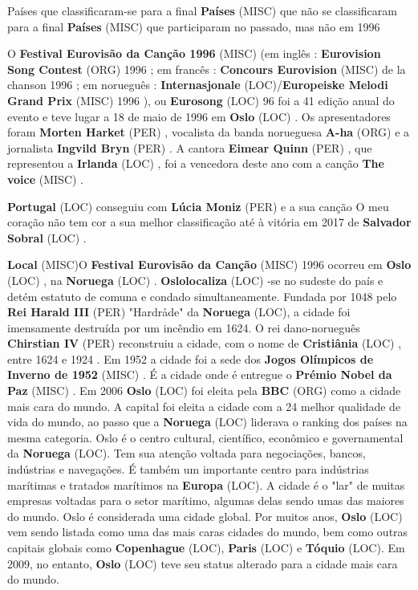 \documentclass[12pt,a4paper]{article}
\begin{document}
Países que classificaram-se para a final \textbf{Países} (MISC) que não se classificaram para a final \textbf{Países} (MISC) que participaram no passado, mas não em 1996

O \textbf{Festival Eurovisão da Canção 1996} (MISC) (em inglês : \textbf{Eurovision Song Contest} (ORG) 1996 ; em francês : \textbf{Concours Eurovision} (MISC) de la chanson 1996 ; em norueguês : \textbf{Internasjonale} (LOC)/\textbf{Europeiske Melodi Grand Prix} (MISC) 1996 ), ou \textbf{Eurosong} (LOC) 96 foi a 41 edição anual do evento e teve lugar a 18 de maio de 1996 em \textbf{Oslo} (LOC) . Os apresentadores foram \textbf{Morten Harket} (PER) , vocalista da banda norueguesa \textbf{A-ha} (ORG) e a jornalista \textbf{Ingvild Bryn} (PER) . A cantora \textbf{Eimear Quinn} (PER) , que representou a \textbf{Irlanda} (LOC) , foi a vencedora deste ano com a canção \textbf{The voice} (MISC) .

\textbf{Portugal} (LOC) conseguiu com \textbf{Lúcia Moniz} (PER) e a sua canção O meu coração não tem cor a sua melhor classificação até à vitória em 2017 de \textbf{Salvador Sobral} (LOC) .



\textbf{Local} (MISC)O \textbf{Festival Eurovisão da Canção} (MISC) 1996 ocorreu em \textbf{Oslo} (LOC) , na \textbf{Noruega} (LOC) . \textbf{Oslolocaliza} (LOC) -se no sudeste do país e detém estatuto de comuna e condado simultaneamente. Fundada por 1048 pelo \textbf{Rei Harald III} (PER) "Hardråde" da \textbf{Noruega} (LOC), a cidade foi imensamente destruída por um incêndio em 1624. O rei dano-norueguês \textbf{Chirstian IV} (PER) reconstruiu a cidade, com o nome de \textbf{Cristiânia} (LOC) , entre 1624 e 1924 . Em 1952 a cidade foi a sede dos \textbf{Jogos Olímpicos de Inverno de 1952} (MISC) . É a cidade onde é entregue o \textbf{Prémio Nobel da Paz} (MISC) . Em 2006 \textbf{Oslo} (LOC) foi eleita pela \textbf{BBC} (ORG) como a cidade mais cara do mundo. A capital foi eleita a cidade com a 24 melhor qualidade de vida do mundo, ao passo que a \textbf{Noruega} (LOC) liderava o ranking dos países na mesma categoria. Oslo é o centro cultural, científico, econômico e governamental da \textbf{Noruega} (LOC). Tem sua atenção voltada para negociações, bancos, indústrias e navegações. É também um importante centro para indústrias marítimas e tratados marítimos na \textbf{Europa} (LOC). A cidade é o "lar" de muitas empresas voltadas para o setor marítimo, algumas delas sendo umas das maiores do mundo. Oslo é considerada uma cidade global. Por muitos anos, \textbf{Oslo} (LOC) vem sendo listada como uma das mais caras cidades do mundo, bem como outras capitais globais como \textbf{Copenhague} (LOC), \textbf{Paris} (LOC) e \textbf{Tóquio} (LOC). Em 2009, no entanto, \textbf{Oslo} (LOC) teve seu status alterado para a cidade mais cara do mundo.
\end{document}

